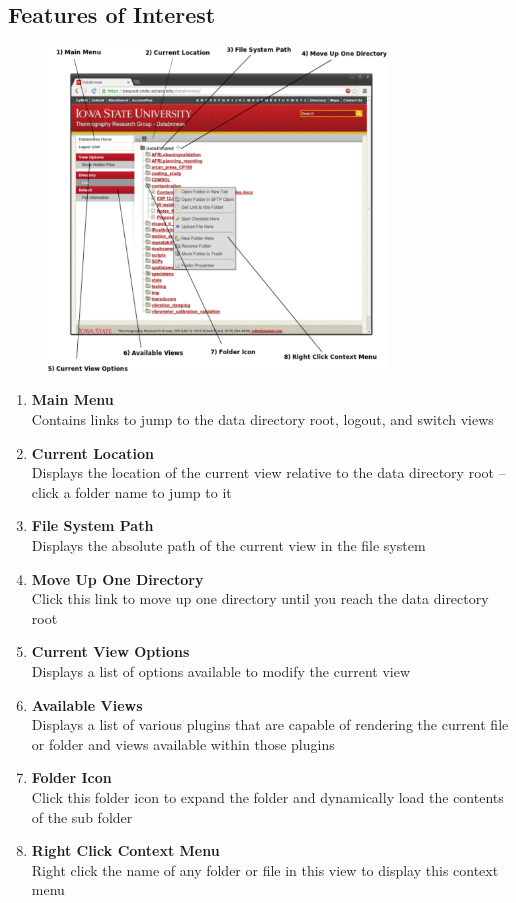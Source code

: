 \documentclass[10pt]{article}
\begin{document}
\subsection{Features of Interest}
\begin{figure}[h!]
	\centering
	\includegraphics[width=0.8\textwidth]{Overview.pdf}
\end{figure}
\begin{multicols}{2}
\begin{enumerate}
    \item \textbf{Main Menu} \\
          Contains links to jump to the data directory root, logout, and switch views
    \item \textbf{Current Location} \\
          Displays the location of the current view relative to the data directory root -- click a folder name to jump to it
    \item \textbf{File System Path} \\
          Displays the absolute path of the current view in the file system
    \item \textbf{Move Up One Directory} \\
          Click this link to move up one directory until you reach the data directory root
    \item \textbf{Current View Options} \\
          Displays a list of options available to modify the current view
    \item \textbf{Available Views} \\
          Displays a list of various plugins that are capable of rendering the current file or folder and views available within those plugins
    \item \textbf{Folder Icon} \\
          Click this folder icon to expand the folder and dynamically load the contents of the sub folder
    \item \textbf{Right Click Context Menu} \\
          Right click the name of any folder or file in this view to display this context menu
\end{enumerate}
\end{multicols}
\end{document}
